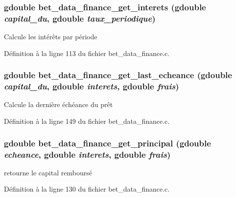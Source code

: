 \subsubsection[{bet\_\-data\_\-finance\_\-get\_\-interets}]{\setlength{\rightskip}{0pt plus 5cm}gdouble bet\_\-data\_\-finance\_\-get\_\-interets (gdouble {\em capital\_\-du}, \/  gdouble {\em taux\_\-periodique})}\label{bet__data__finance_8h_a6a129b4a8d1873a1215384ab6ccee3e6}
Calcule les intérêts par période 

Définition à la ligne 113 du fichier bet\_\-data\_\-finance.c.

\subsubsection[{bet\_\-data\_\-finance\_\-get\_\-last\_\-echeance}]{\setlength{\rightskip}{0pt plus 5cm}gdouble bet\_\-data\_\-finance\_\-get\_\-last\_\-echeance (gdouble {\em capital\_\-du}, \/  gdouble {\em interets}, \/  gdouble {\em frais})}\label{bet__data__finance_8h_a000ced710980fbd826287f66cd12a153}
Calcule la dernière échéance du prêt 

Définition à la ligne 149 du fichier bet\_\-data\_\-finance.c.

\subsubsection[{bet\_\-data\_\-finance\_\-get\_\-principal}]{\setlength{\rightskip}{0pt plus 5cm}gdouble bet\_\-data\_\-finance\_\-get\_\-principal (gdouble {\em echeance}, \/  gdouble {\em interets}, \/  gdouble {\em frais})}\label{bet__data__finance_8h_a66297619c92a4041ff4f4fe1240f212a}
retourne le capital remboursé 

Définition à la ligne 130 du fichier bet\_\-data\_\-finance.c.

